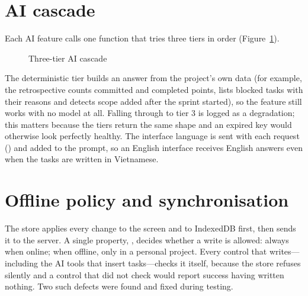 \documentclass[../main.tex]{subfiles}
\begin{document}
\section{AI cascade}
Each AI feature calls one function that tries three tiers in order (Figure~\ref{fig:cascade}).

\begin{figure}[H]
\centering
{}
\caption{Three-tier AI cascade}\label{fig:cascade}
\end{figure}

The deterministic tier builds an answer from the project's own data (for example, the
retrospective counts committed and completed points, lists blocked tasks with their reasons and
detects scope added after the sprint started), so the feature still works with no model at all.
Falling through to tier 3 is logged as a degradation; this matters because the tiers return the same
shape and an expired key would otherwise look perfectly healthy. The interface language is sent
with each request () and added to the prompt, so an English interface
receives English answers even when the tasks are written in Vietnamese.

\section{Offline policy and synchronisation}
The store applies every change to the screen and to IndexedDB first, then sends it to the server.
A single property, , decides whether a write is allowed: always when online; when
offline, only in a personal project. Every control that writes---including the AI tools that insert
tasks---checks it itself, because the store refuses silently and a control that did not check would
report success having written nothing. Two such defects were found and fixed during testing.
\end{document}
